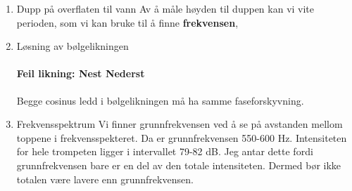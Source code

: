 \documentclass{article}
\begin{document}
\begin{enumerate}
    
    \item Dupp på overflaten til vann 
      Av å måle høyden til duppen kan vi vite perioden, som vi kan bruke til å finne \textbf{frekvensen}, 
    
    \item Løsning av bølgelikningen %
      \paragraph*{Feil likning: Nest Nederst}
      Begge cosinus ledd i bølgelikningen må ha samme faseforskyvning. 
      
    
    \item Frekvensspektrum %
      Vi finner grunnfrekvensen ved å se på avstanden mellom toppene i frekvensspekteret. Da er grunnfrekvensen 550-600 Hz. Intensiteten for hele trompeten ligger i intervallet 79-82 dB. Jeg antar dette fordi grunnfrekvensen bare er en del av den totale intensiteten. Dermed bør ikke totalen være lavere enn grunnfrekvensen.
      
  \end{enumerate}
\end{document}
